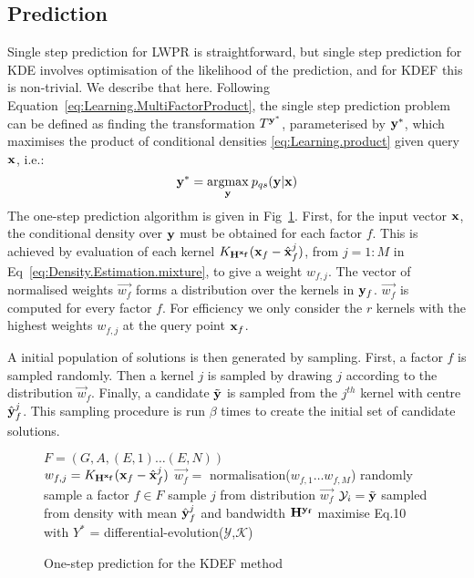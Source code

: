 \subsection{Prediction}
Single step prediction for LWPR is straightforward, but single step prediction for KDE involves optimisation of the likelihood of the prediction, and for KDEF this is non-trivial. We describe that here. Following Equation~\eqref{eq:Learning.MultiFactorProduct},
the single step prediction problem can be defined as finding the
transformation $T^{\mathbf{y}^*}$, parameterised by $\mathbf{y}^*$, which maximises the product of conditional densities
\eqref{eq:Learning.product} given query $\mathbf{x}$, i.e.:
\begin{equation}
 \mathbf{y}^*= \underset{\mathbf{y}}{\operatorname{argmax}}\medspace p_{qs}(\mathbf{y}|\mathbf{x})
\label{eq:Density.Estimation.max}
\end{equation}
The one-step prediction algorithm is given in Fig~\ref{alg:prediction}. First, for the input vector $\mathbf{x}$, the conditional density over $\mathbf{y}$ must be obtained for each factor $f$. This is achieved by evaluation of each kernel  $K_{\mathbf{H^{\mathbf{x}_f}}}(\mathbf{x}_f - \hat{\mathbf{x}}_f^j)$, from \mbox{$j=1:M$} in Eq~\eqref{eq:Density.Estimation.mixture}, to give a weight $w_{f,j}$. The vector of normalised weights $\vec{w_f}$ forms a distribution over the kernels in $\mathbf{y}_f$. $\vec{w_f}$ is computed for every factor $f$. For efficiency we only consider the $r$ kernels with the highest weights $w_{f,j}$ at the query point $\mathbf{x}_f$. 

A initial population of solutions is then generated by sampling. First, a factor $f$ is sampled randomly. Then a kernel $j$ is sampled by drawing $j$ according to the distribution $\vec{w}_f$. Finally, a candidate $\tilde{\mathbf{y}}$ is sampled from the $j^{th}$ kernel with centre $\hat{\mathbf{y}}^j_f$. This sampling procedure is run $\beta$ times to create the initial set of candidate solutions.
\begin{figure}
\begin{center}
\begin{algorithmic}
\STATE $F = (G, A, (E,1) \ldots (E,N))$  \\
\STATE $w_{f,j} = K_{\mathbf{H^{\mathbf{x}_f}}}(\mathbf{x}_f - \hat{\mathbf{x}}_f^j)$
\ENDFOR
\STATE $\vec{w_f} =$ normalisation($w_{f,1} \ldots w_{f,M}$)
\ENDFOR
{}
\STATE randomly sample a factor $f\in F$ 
\STATE sample $j$ from distribution $\vec{w_f}$
\STATE  $\mathcal{Y}_i = \tilde{\mathbf{y}}$ sampled from density with mean $\hat{\mathbf{y}}^j_f$ and bandwidth $\mathbf{H^{\mathbf{y}_f}}$
\ENDFOR
\STATE maximise Eq.10 with $Y^*$ = differential-evolution($\mathcal{Y}$,$\mathcal{K}$) 
\end{algorithmic}
\caption{\label{alg:prediction}One-step prediction for the KDEF method}
\end{center}
\end{figure}

